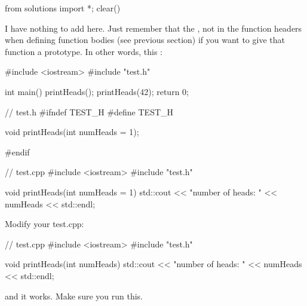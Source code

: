 \begin{python0}
from solutions import *; clear()
\end{python0}

I have nothing to add here. Just remember that the , not in the function headers when defining function bodies (see previous section) if you want to give that function a prototype. In other words, this :

\begin{consolethree}[escapeinside=||]
#include <iostream>
#include "test.h"

int main()
{
    printHeads();
    printHeads(42);
    return 0;
}
\end{consolethree}

\begin{consolethree}[escapeinside=||]
// test.h
#ifndef TEST_H
#define TEST_H

void printHeads(int numHeads = 1);

#endif
\end{consolethree}

\begin{consolethree}[escapeinside=||]
// test.cpp
#include <iostream>
#include "test.h"

void printHeads(int numHeads = 1)
{
    std::cout << "number of heads: " << numHeads
              << std::endl;
}
\end{consolethree}

Modify your test.cpp:

\begin{consolethree}[escapeinside=||]
// test.cpp
#include <iostream>
#include "test.h"

void printHeads(int numHeads)
{
    std::cout << "number of heads: " << numHeads
              << std::endl;
}
\end{consolethree}

and it works. Make sure you run this.



